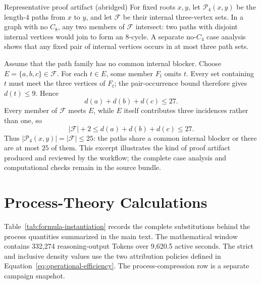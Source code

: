 \begin{paperbox}{Representative proof artifact (abridged)}
\small
For fixed roots $x,y$, let $\mathcal{P}_4(x,y)$ be the length-$4$ paths from
$x$ to $y$, and let $\mathcal{F}$ be their internal three-vertex sets. In a
graph with no $C_8$, any two members of $\mathcal{F}$ intersect: two paths with
disjoint internal vertices would join to form an $8$-cycle. A separate
no-$C_4$ case analysis shows that any fixed pair of internal vertices occurs in
at most three path sets.

Assume that the path family has no common internal blocker. Choose
$E=\{a,b,c\}\in\mathcal{F}$. For each $t\in E$, some member $F_t$ omits $t$.
Every set containing $t$ must meet the three vertices of $F_t$; the pair-occurrence
bound therefore gives $d(t)\leq 9$. Hence
\[
  d(a)+d(b)+d(c)\leq 27.
\]
Every member of $\mathcal{F}$ meets $E$, while $E$ itself contributes three
incidences rather than one, so
\[
  |\mathcal{F}|+2\leq d(a)+d(b)+d(c)\leq 27.
\]
Thus $|\mathcal{P}_4(x,y)|=|\mathcal{F}|\leq25$: the paths share a common
internal blocker or there are at most $25$ of them. This excerpt illustrates the
kind of proof artifact produced and reviewed by the workflow; the complete case
analysis and computational checks remain in the source bundle.
\end{paperbox}

\section{Process-Theory Calculations}
\label{app:formula-instantiation}

Table~\ref{tab:formula-instantiation} records the complete substitutions behind the
process quantities summarized in the main text. The mathematical window contains
332,274 reasoning-output Tokens over 9,620.5 active seconds. The strict and
inclusive density values use the two attribution policies defined in
Equation~\ref{eq:operational-efficiency}. The process-compression row is a separate
campaign snapshot.

